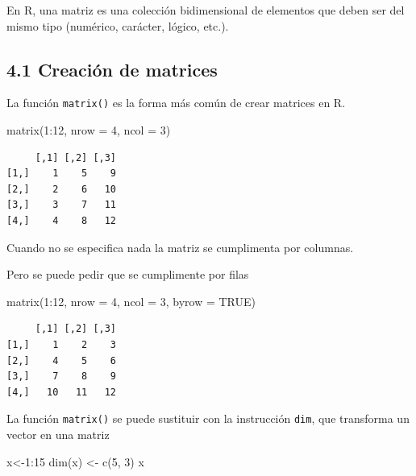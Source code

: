 \documentclass[
  letterpaper,
]{scrbook}
\newenvironment{Shaded}{\begin{snugshade}}{\end{snugshade}}
\newcommand{\AttributeTok}[1]{\textcolor[rgb]{0.40,0.45,0.13}{#1}}
\newcommand{\ConstantTok}[1]{\textcolor[rgb]{0.56,0.35,0.01}{#1}}
\newcommand{\DecValTok}[1]{\textcolor[rgb]{0.68,0.00,0.00}{#1}}
\newcommand{\FunctionTok}[1]{\textcolor[rgb]{0.28,0.35,0.67}{#1}}
\newcommand{\NormalTok}[1]{\textcolor[rgb]{0.00,0.23,0.31}{#1}}
\newcommand{\OtherTok}[1]{\textcolor[rgb]{0.00,0.23,0.31}{#1}}
\newcommand{\SpecialCharTok}[1]{\textcolor[rgb]{0.37,0.37,0.37}{#1}}
\begin{document}
En R, una matriz es una colección bidimensional de elementos que deben
ser del mismo tipo (numérico, carácter, lógico, etc.).

\hypertarget{creaciuxf3n-de-matrices}{%
\subsection{4.1 Creación de matrices}\label{creaciuxf3n-de-matrices}}

La función \texttt{matrix()} es la forma más común de crear matrices en
R.

\begin{Shaded}
\begin{Highlighting}[]
\FunctionTok{matrix}\NormalTok{(}\DecValTok{1}\SpecialCharTok{:}\DecValTok{12}\NormalTok{, }\AttributeTok{nrow =} \DecValTok{4}\NormalTok{, }\AttributeTok{ncol =} \DecValTok{3}\NormalTok{)}
\end{Highlighting}
\end{Shaded}

\begin{verbatim}
     [,1] [,2] [,3]
[1,]    1    5    9
[2,]    2    6   10
[3,]    3    7   11
[4,]    4    8   12
\end{verbatim}

Cuando no se especifica nada la matriz se cumplimenta por columnas.

Pero se puede pedir que se cumplimente por filas

\begin{Shaded}
\begin{Highlighting}[]
\FunctionTok{matrix}\NormalTok{(}\DecValTok{1}\SpecialCharTok{:}\DecValTok{12}\NormalTok{, }\AttributeTok{nrow =} \DecValTok{4}\NormalTok{, }\AttributeTok{ncol =} \DecValTok{3}\NormalTok{, }\AttributeTok{byrow =} \ConstantTok{TRUE}\NormalTok{)}
\end{Highlighting}
\end{Shaded}

\begin{verbatim}
     [,1] [,2] [,3]
[1,]    1    2    3
[2,]    4    5    6
[3,]    7    8    9
[4,]   10   11   12
\end{verbatim}

La función \texttt{matrix()} se puede sustituir con la instrucción
\texttt{dim}, que transforma un vector en una matriz

\begin{Shaded}
\begin{Highlighting}[]
\NormalTok{x}\OtherTok{\textless{}{-}}\DecValTok{1}\SpecialCharTok{:}\DecValTok{15}
\FunctionTok{dim}\NormalTok{(x) }\OtherTok{\textless{}{-}} \FunctionTok{c}\NormalTok{(}\DecValTok{5}\NormalTok{, }\DecValTok{3}\NormalTok{)}
\NormalTok{x}
\end{Highlighting}
\end{Shaded}
\end{document}
